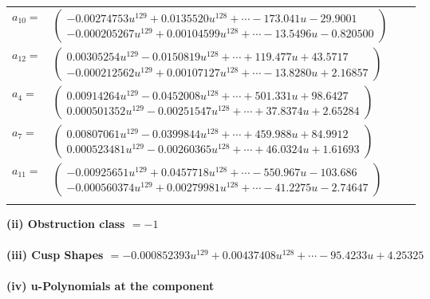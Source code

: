 \documentclass[1p]{elsarticle_modified}
\theoremstyle{definition}
\begin{document}
\begin{tabular}{m{7pt} m{180pt} m{7pt} m{180pt} }
\flushright $a_{10}=$&$\begin{pmatrix}-0.00274753 u^{129}+0.0135520 u^{128}+\cdots-173.041 u-29.9001\\-0.000205267 u^{129}+0.00104599 u^{128}+\cdots-13.5496 u-0.820500\end{pmatrix}$ \\
\flushright $a_{12}=$&$\begin{pmatrix}0.00305254 u^{129}-0.0150819 u^{128}+\cdots+119.477 u+43.5717\\-0.000212562 u^{129}+0.00107127 u^{128}+\cdots-13.8280 u+2.16857\end{pmatrix}$ \\
\flushright $a_{4}=$&$\begin{pmatrix}0.00914264 u^{129}-0.0452008 u^{128}+\cdots+501.331 u+98.6427\\0.000501352 u^{129}-0.00251547 u^{128}+\cdots+37.8374 u+2.65284\end{pmatrix}$ \\
\flushright $a_{7}=$&$\begin{pmatrix}0.00807061 u^{129}-0.0399844 u^{128}+\cdots+459.988 u+84.9912\\0.000523481 u^{129}-0.00260365 u^{128}+\cdots+46.0324 u+1.61693\end{pmatrix}$ \\
\flushright $a_{11}=$&$\begin{pmatrix}-0.00925651 u^{129}+0.0457718 u^{128}+\cdots-550.967 u-103.686\\-0.000560374 u^{129}+0.00279981 u^{128}+\cdots-41.2275 u-2.74647\end{pmatrix}$\\&\end{tabular}
\flushleft \textbf{(ii) Obstruction class $= -1$}\\~\\
\flushleft \textbf{(iii) Cusp Shapes $= -0.000852393 u^{129}+0.00437408 u^{128}+\cdots-95.4233 u+4.25325$}\\~\\
\newpage\renewcommand{\arraystretch}{1}
\flushleft \textbf{(iv) u-Polynomials at the component}\newline \\
\end{document}
